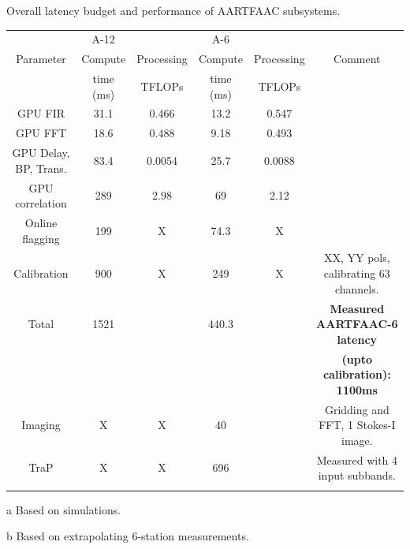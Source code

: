 \documentclass{ws-jai}
\begin{document}
\begin{wstable}[h]
\caption{Overall latency budget and performance of AARTFAAC subsystems.}
\begin{tabular}{@{}cccccc@{}} \toprule
 & A-12 & & A-6 & & \\ \colrule
Parameter & Compute & Processing  & Compute  & Processing  & Comment \\
 & time (ms) & TFLOPs & time (ms) & TFLOPs & \\
 \colrule
GPU FIR & 31.1 & 0.466 & 13.2 & 0.547 \\
GPU FFT & 18.6 & 0.488 & 9.18 & 0.493  \\
GPU Delay, BP, Trans. & 83.4 & 0.0054 & 25.7 & 0.0088  \\
GPU correlation & 289 & 2.98 & 69 & 2.12 \\
Online flagging & 199\tnote{a} & X  & 74.3 & X & \\
Calibration & 900\tnote{b} & X & 249 & X &  XX, YY pols, calibrating 63 channels.\\
 \colrule
Total & 1521 & & 440.3 & & \textbf{Measured AARTFAAC-6 latency} \\
 & & & & & \textbf {(upto calibration): 1100ms} \\ \colrule

Imaging & X & X  & 40 & & Gridding and FFT, 1 Stokes-I image.\\ 
TraP & X & X & 696 & &  Measured with 4 input subbands.\\ \colrule
\end{tabular}
\begin{tablenotes}
\item[a] Based on simulations.
\item[b] Based on extrapolating 6-station measurements.
\end{tablenotes}
\label{tab:afaac_latency}
\end{wstable}


\end{document}
